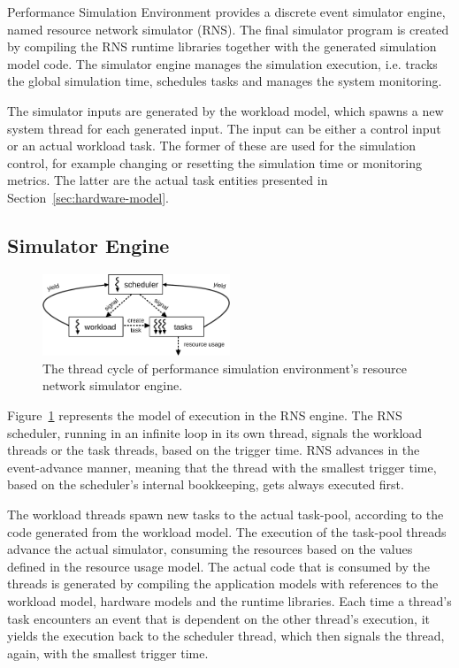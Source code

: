 Performance Simulation Environment provides a discrete event simulator engine, named resource network simulator (RNS). The final simulator program is created by compiling the RNS runtime libraries together with the generated simulation model code. The simulator engine manages the simulation execution, i.e. tracks the global simulation time, schedules tasks and manages the system monitoring.

The simulator inputs are generated by the workload model, which spawns a new system thread for each generated input. The input can be either a control input or an actual workload task. The former of these are used for the simulation control, for example changing or resetting the simulation time or monitoring metrics. The latter are the actual task entities presented in Section~\ref{sec:hardware-model}.

\subsection{Simulator Engine}
\label{sec:simulator-engine}

\begin{figure}[]
  \begin{center}
    \includegraphics[width=0.5\textwidth]{images/rns-threads.pdf}
    \caption{The thread cycle of performance simulation environment's resource network simulator engine.}
    \label{fig:rns-threads}
  \end{center}
\end{figure}

Figure~\ref{fig:rns-threads} represents the model of execution in the RNS engine. The RNS scheduler, running in an infinite loop in its own thread, signals the workload threads or the task threads, based on the trigger time. RNS advances in the event-advance manner, meaning that the thread with the smallest trigger time, based on the scheduler's internal bookkeeping, gets always executed first.

The workload threads spawn new tasks to the actual task-pool, according to the code generated from the workload model. The execution of the task-pool threads advance the actual simulator, consuming the resources based on the values defined in the resource usage model. The actual code that is consumed by the threads is generated by compiling the application models with references to the workload model, hardware models and the runtime libraries. Each time a thread's task encounters an event that is dependent on the other thread's execution, it yields the execution back to the scheduler thread, which then signals the thread, again, with the smallest trigger time.

